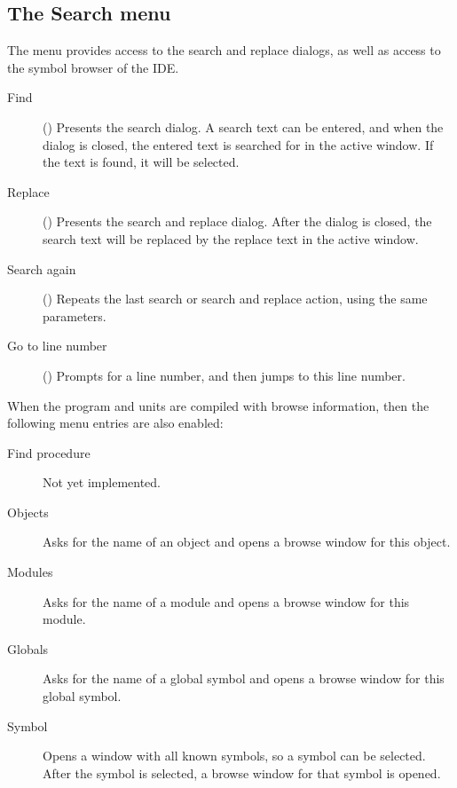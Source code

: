 %
%
\subsection{The Search menu}
\label{se:menusearch}
The  menu provides access to the search and replace dialogs, as well as
access to the symbol browser of the IDE.
\begin{description}
\item[Find] () Presents the search dialog. A search text
can be entered, and when the dialog is closed, the entered text is searched
for in the active window. If the text is found, it will be selected.
\item[Replace] () Presents the search and replace dialog.
After the dialog is closed, the search text will be replaced by the replace
text in the active window.
\item[Search again] () Repeats the last search or search and replace action,
 using  the same parameters.
\item[Go to line number] () Prompts for a line number, and
then jumps to this line number.
\end{description}
When the program and units are compiled with browse information, then
the following menu entries are also enabled:
\begin{description}
\item[Find procedure]
Not yet implemented.
\item[Objects]
Asks for the name of an object and opens a browse window for this object.
\item[Modules]
Asks for the name of a module and opens a browse window for this module.
\item[Globals]
Asks for the name of a global symbol and opens a browse window for this
global symbol.
\item[Symbol]
Opens a window with all known symbols, so a symbol can be selected. After
the symbol is selected, a browse window for that symbol is opened.
\end{description}
%
%
